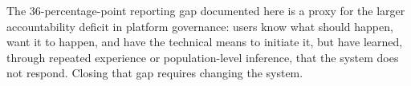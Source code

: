 \documentclass{ieee-portfolio}
\begin{document}
The 36-percentage-point reporting gap documented here is a proxy for the larger accountability deficit in platform governance: users know what should happen, want it to happen, and have the technical means to initiate it, but have learned, through repeated experience or population-level inference, that the system does not respond. Closing that gap requires changing the system.

\glsaddall
{}
\printglossary[type=\acronymtype,title=List of Acronyms]



\end{document}
